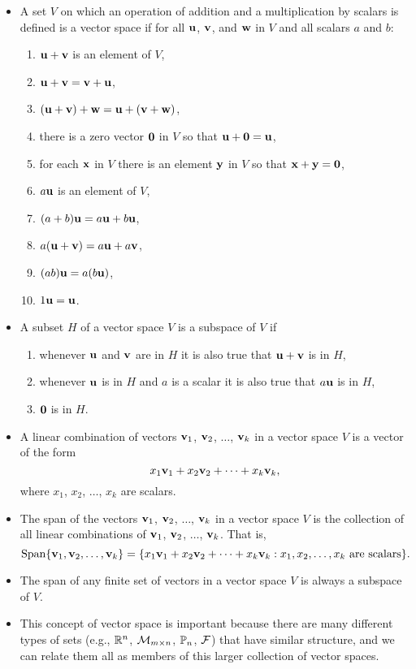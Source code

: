 
\begin{itemize}
\item  A set $V$ on which an operation of addition and a multiplication by scalars is defined is a vector space if for all $\mathbf{u}$, $\mathbf{v}$, and $\mathbf{w}$ in $V$ and all scalars $a$ and $b$:
\begin{enumerate}
\item $\mathbf{u} + \mathbf{v}$ is an element of $V$,
\item $\mathbf{u} + \mathbf{v} = \mathbf{v} + \mathbf{u}$,
\item $(\mathbf{u} + \mathbf{v}) + \mathbf{w} = \mathbf{u} + (\mathbf{v} + \mathbf{w})$,
\item there is a zero vector $\mathbf{0}$ in $V$ so that $\mathbf{u} + \mathbf{0} = \mathbf{u}$,
\item for each $\mathbf{x}$ in $V$ there is an element $\mathbf{y}$ in $V$ so that $\mathbf{x} + \mathbf{y} = \mathbf{0}$,
\item $a \mathbf{u}$ is an element of $V$,
\item $(a+b) \mathbf{u} = a\mathbf{u} + b\mathbf{u}$,
\item $a(\mathbf{u} + \mathbf{v}) = a\mathbf{u} + a\mathbf{v}$,
\item $(ab) \mathbf{u} = a(b\mathbf{u})$,
\item $1 \mathbf{u} = \mathbf{u}$.
\end{enumerate}
\item A subset $H$ of a vector space $V$ is a subspace of $V$ if
\begin{enumerate}
\item whenever $\mathbf{u}$ and $\mathbf{v}$ are in $H$ it is also true that $\mathbf{u} + \mathbf{v}$ is in $H$,
\item whenever $\mathbf{u}$ is in $H$ and $a$ is a scalar it is also true that $a\mathbf{u}$ is in $H$,
\item $\mathbf{0}$ is in $H$.
\end{enumerate}
\item A linear combination of vectors $\mathbf{v}_1$, $\mathbf{v}_2$, $\ldots$, $\mathbf{v}_k$ in a vector space $V$ is a vector of the form 
\[x_1\mathbf{v}_1+x_2\mathbf{v}_2 + \cdots + x_k \mathbf{v}_k,\]
where $x_1$, $x_2$, $\ldots$, $x_k$ are scalars. 
\item The span of the vectors $\mathbf{v}_1$, $\mathbf{v}_2$, $\ldots$, $\mathbf{v}_k$ in a vector space $V$ is the collection of all linear combinations of $\mathbf{v}_1$, $\mathbf{v}_2$, $\ldots$, $\mathbf{v}_k$. That is,
\[\text{Span}\{\mathbf{v}_1, \mathbf{v}_2, \ldots, \mathbf{v}_k\} = \{x_1\mathbf{v}_1+x_2\mathbf{v}_2 + \cdots + x_k \mathbf{v}_k : x_1, x_2, \ldots, x_k \text{ are scalars}\}.\]
\item The span of any finite set of vectors in a vector space $V$ is always a subspace of $V$. 
\item This concept of vector space is important because there are many different types of sets (e.g., $\mathbb{R}^n$, $\mathcal{M}_{m \times n}$, $\mathbb{P}_n$, $\mathcal{F}$) that have similar structure, and we can relate them all as members of this larger collection of vector spaces. 
\end{itemize}


